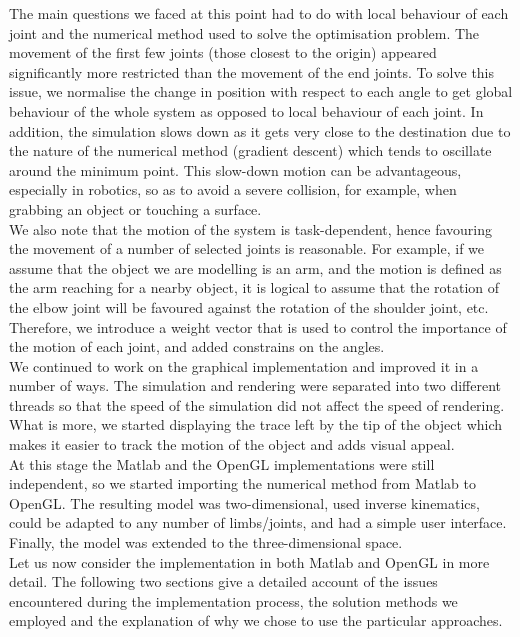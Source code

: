 \documentclass[paper=a4, fontsize=11pt]{scrartcl} %
\numberwithin{equation}{section} %
\numberwithin{figure}{section} %
\numberwithin{table}{section} %
\begin{document}
The main questions we faced at this point had to do with local behaviour of each joint and the numerical method used to solve the optimisation problem. The movement of the first few joints (those closest to the origin) appeared significantly more restricted than the movement of the end joints. To solve this issue, we normalise the change in position with respect to each angle to get global behaviour of the whole system as opposed to local behaviour of each joint. In addition, the simulation slows down as it gets very close to the destination due to the nature of the numerical method (gradient descent) which tends to oscillate around the minimum point. This slow-down motion can be advantageous, especially in robotics, so as to avoid a severe collision, for example, when grabbing an object or touching a surface. \\

We also note that the motion of the system is task-dependent, hence favouring the movement of a number of selected joints is reasonable. For example, if we assume that the object we are modelling is an arm, and the motion is defined as the arm reaching for a nearby object, it is logical to assume that the rotation of the elbow joint will be favoured against the rotation of the shoulder joint, etc. Therefore, we introduce a weight vector that is used to control the importance of the motion of each joint, and added constrains on the angles.\\

We continued to work on the graphical implementation and improved it in a number of ways. The simulation and rendering were separated into two different threads so that the speed of the simulation did not affect the speed of rendering. What is more, we started displaying the trace left by the tip of the object which makes it easier to track the motion of the object and adds visual appeal. \\

At this stage the Matlab and the OpenGL implementations were still independent, so we started importing the numerical method from Matlab to OpenGL. The resulting model was two-dimensional, used inverse kinematics, could be adapted to any number of limbs/joints, and had a simple user interface. Finally, the model was extended to the three-dimensional space. \\

Let us now consider the implementation in both Matlab and OpenGL in more detail. The following two sections give a detailed account of the issues encountered during the implementation process, the solution methods we employed and the explanation of why we chose to use the particular approaches.
\end{document}
